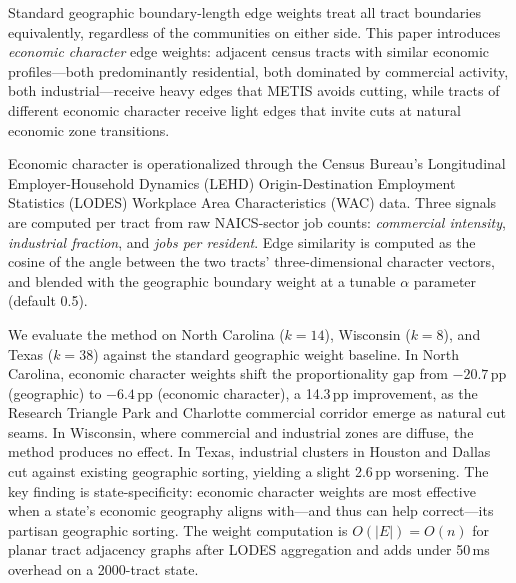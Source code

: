 Standard geographic boundary-length edge weights treat all tract boundaries
equivalently, regardless of the communities on either side.
This paper introduces \emph{economic character} edge weights: adjacent census
tracts with similar economic profiles---both predominantly residential, both
dominated by commercial activity, both industrial---receive heavy edges that
METIS avoids cutting, while tracts of different economic character receive
light edges that invite cuts at natural economic zone transitions.

Economic character is operationalized through the Census Bureau's
Longitudinal Employer-Household Dynamics (LEHD) Origin-Destination Employment
Statistics (LODES) Workplace Area Characteristics (WAC) data.
Three signals are computed per tract from raw NAICS-sector job counts:
\emph{commercial intensity}, \emph{industrial fraction}, and
\emph{jobs per resident}.
Edge similarity is computed as the cosine of the angle between the two tracts'
three-dimensional character vectors, and blended with the geographic boundary
weight at a tunable $\alpha$ parameter (default 0.5).

We evaluate the method on North Carolina ($k=14$), Wisconsin ($k=8$), and
Texas ($k=38$) against the standard geographic weight baseline.
In North Carolina, economic character weights shift the proportionality gap
from $-20.7$\,pp (geographic) to $-6.4$\,pp (economic character), a
14.3\,pp improvement, as the Research Triangle Park and Charlotte commercial
corridor emerge as natural cut seams.
In Wisconsin, where commercial and industrial zones are diffuse, the method
produces no effect.
In Texas, industrial clusters in Houston and Dallas cut against existing
geographic sorting, yielding a slight 2.6\,pp worsening.
The key finding is state-specificity: economic character weights are most
effective when a state's economic geography aligns with---and thus can help
correct---its partisan geographic sorting.
The weight computation is $O(|E|) = O(n)$ for planar tract adjacency graphs
after LODES aggregation and adds under 50\,ms overhead on a 2000-tract state.
